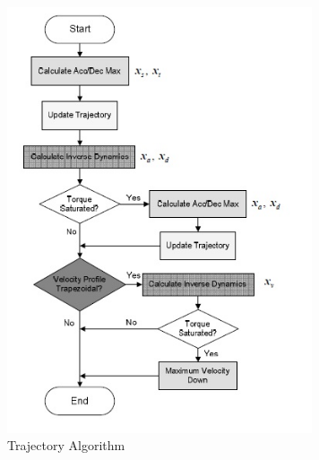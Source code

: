 \begin{figure}[htbp] %
 \centering
   \includegraphics[width=9cm]{images/AlgoFlowchart.jpg}
   \caption[Trajectory Algorithm \citet{JoonYoungKim2007}]
   {Trajectory Algorithm \citet{JoonYoungKim2007}}
\label{fig:img1}
\end{figure}


